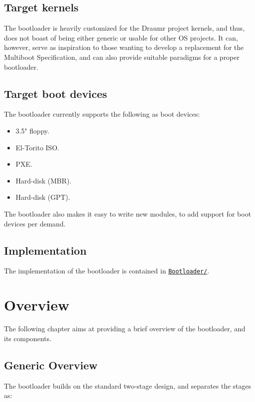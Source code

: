 \documentclass[a4paper,oneside]{memoir}
\begin{document}
\section{Target kernels}

The bootloader is heavily customized for the Draumr project kernels, and thus, does not boast of being either generic or usable for other OS projects. It can, however, serve as inspiration to those wanting to develop a replacement for the Multiboot Specification, and can also provide suitable paradigms for a proper bootloader.

\section{Target boot devices}

The bootloader currently supports the following as boot devices:

\begin{itemize}
    \item 3.5" floppy.
    \item El-Torito ISO.
    \item PXE.
    \item Hard-disk (MBR).
    \item Hard-disk (GPT).
\end{itemize}

The bootloader also makes it easy to write new modules, to add support for boot devices per demand.

\section{Implementation}

The implementation of the bootloader is contained in \texttt{\href{run:./../../Bootloader/}{Bootloader/}}.

\chapter{Overview}

The following chapter aims at providing a brief overview of the bootloader, and its components.

\section{Generic Overview}
\label{sec:Generic Overview}

The bootloader builds on the standard two-stage design, and separates the stages as:
\end{document}
